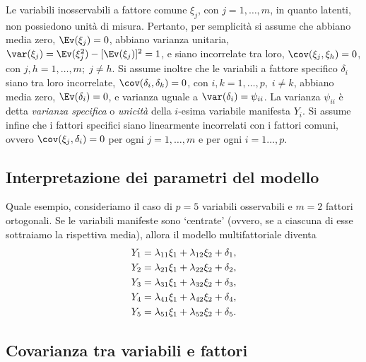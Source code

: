 Le variabili inosservabili a fattore comune $\xi_j$, con $j=1, \dots, m$, in quanto latenti, non possiedono unità di misura. 
Pertanto, per semplicità  si assume che abbiano media zero, $\Ev (\xi_j)=0$, abbiano varianza unitaria, $\var (\xi_j)= \Ev (\xi_j^2) - [\Ev (\xi_j)]^2=1$, e siano incorrelate tra loro, $\cov(\xi_j, \xi_h)=0$, con $j, h = 1, \dots, m; \;j \neq h$. 
Si assume inoltre che le variabili a fattore specifico $\delta_i$ 
siano tra loro incorrelate, $\cov(\delta_i,\delta_k)=0$, con $i, k = 1, \dots, p, \; i \neq k$, abbiano media zero, $\Ev (\delta_i)=0$, e varianza uguale a $\var (\delta_i) = \psi_{ii}$.
La varianza $\psi_{ii}$ è detta \emph{varianza specifica} o \emph{unicità} della $i$-esima variabile manifesta $Y_i$.
Si assume infine che i fattori specifici siano linearmente incorrelati con i fattori comuni, ovvero  $\cov(\xi_j, \delta_i)=0$ per ogni $j=1, \dots, m$ e per ogni $i=1\dots,p$. 


\subsection{Interpretazione dei parametri del modello}

Quale esempio, consideriamo il caso di $p=5$ variabili osservabili e $m=2$ fattori ortogonali.
Se le variabili manifeste sono `centrate' (ovvero, se a ciascuna di esse sottraiamo la rispettiva media), allora il modello multifattoriale diventa
\begin{align}
  Y_1 &= \lambda_{11} \xi_1 + \lambda_{12} \xi_2 + \delta_1,\notag\\
  Y_2 &= \lambda_{21} \xi_1 + \lambda_{22} \xi_2 + \delta_2,\notag\\
  Y_3 &= \lambda_{31} \xi_1 + \lambda_{32} \xi_2 + \delta_3,\notag\\
  Y_4 &= \lambda_{41} \xi_1 + \lambda_{42} \xi_2 + \delta_4,\notag\\
  Y_5 &= \lambda_{51} \xi_1 + \lambda_{52} \xi_2 + \delta_5.\notag
  \label{plurifattore2}
\end{align}


\subsection{Covarianza tra variabili e fattori}

